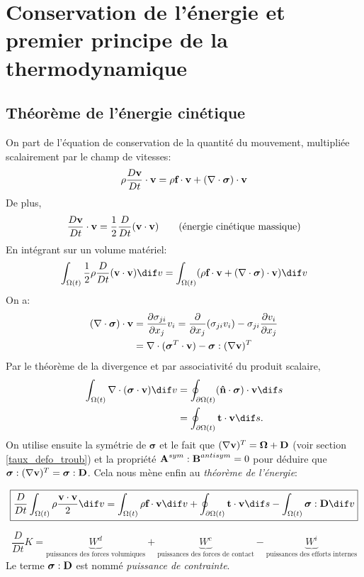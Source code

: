 \section{Conservation de l'énergie et premier principe de la thermodynamique}
\subsection{Théorème de l'énergie cinétique}
On part de l'équation de conservation de la quantité du mouvement, multipliée scalairement par le champ de vitesses:
$$\rho\frac{D\textbf{v}}{Dt}\cdot\textbf{v}=\rho\textbf{f}\cdot\textbf{v}+(\nabla\cdot\boldsymbol{\sigma})\cdot\textbf{v}$$
De plus, $$\frac{D\textbf{v}}{Dt}\cdot\textbf{v}=\frac{1}{2}\frac{D}{Dt}(\textbf{v}\cdot\textbf{v})\qquad\text{(énergie cinétique massique)}$$
En intégrant sur un volume matériel:
$$\int_{\Omega (t)}\frac{1}{2}\rho\frac{D}{Dt}(\fv{v}\cdot\fv{v}) \dif v=\int_{\Omega (t)}(\rho\fv{f}\cdot\fv{v}+(\nabla\cdot\boldsymbol{\sigma})\cdot\fv{v}) \dif v$$
On a:
\begin{align*}
(\nabla\cdot\boldsymbol{\sigma})\cdot\textbf{v}&=\frac{\partial \sigma_{ji}}{\partial x_j}v_i=\frac{\partial}{\partial x_j}(\sigma_{ji}v_i)-\sigma_{ji}\frac{\partial v_i}{\partial x_j}\\
 &=\nabla\cdot(\boldsymbol{\sigma}^T\cdot\textbf{v})-\boldsymbol{\sigma}:(\nabla\textbf{v})^T\\
\end{align*}
Par le théorème de la divergence et par associativité du produit scalaire,
\begin{align*}
  \int_{\Omega (t)}\nabla\cdot(\boldsymbol{\sigma}\cdot\fv{v}) \dif v
  & = \oint_{\partial \Omega (t)}(\sp{\fv{\^n}}{\boldsymbol{\sigma}}) \cdot \fv{v} \dif s\\
  & = \oint_{\partial \Omega (t)}\fv{t}\cdot\fv{v} \dif s.
\end{align*}
On utilise ensuite la symétrie de $\boldsymbol{\sigma}$ et le fait que $(\nabla\textbf{v})^T=\boldsymbol{\Omega}+\textbf{D}$ (voir section \ref{taux_defo_troub}) et la propriété $\textbf{A}^{sym}:\textbf{B}^{antisym}=0$ pour déduire que $\boldsymbol{\sigma}:(\nabla\textbf{v})^T=\boldsymbol{\sigma}:\textbf{D}$. Cela nous mène enfin au \emph{théorème de l'énergie}:

$$\boxed{\frac{D}{Dt}\int_{\Omega (t)}\rho\frac{\fv{v}\cdot\fv{v}}{2} \dif v=\int_{\Omega (t)}\rho\fv{f}\cdot\fv{v} \dif v+\oint_{\partial \Omega (t)}\fv{t}\cdot\fv{v} \dif s-\int_{\Omega (t)}\boldsymbol{\sigma}:\fv{D} \dif v}$$

$$\frac{D}{Dt}K=\underbrace{W^d}_{\text{puissances des forces volumiques}}+\underbrace{W^c}_{\text{puissances des forces de contact}}-\underbrace{W^i}_{\text{puissances des efforts internes}}$$
Le terme $\boldsymbol{\sigma}:\textbf{D}$ est nommé \emph{puissance de contrainte}.
